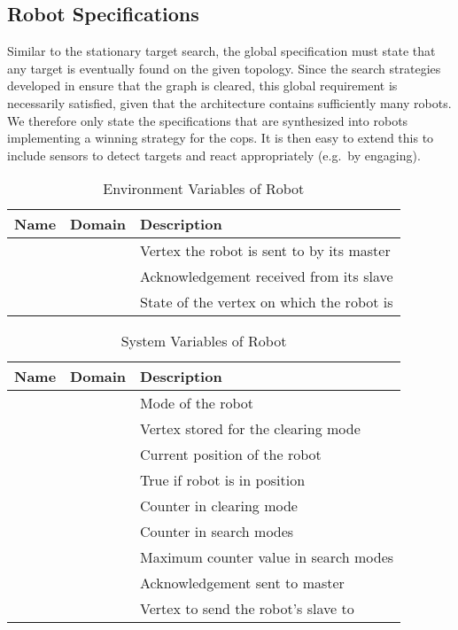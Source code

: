 \subsection{Robot Specifications} \label{sec:robspec}

Similar to the stationary target search, the global specification must state that any target is eventually found on the given topology. Since the search strategies developed in  ensure that the graph is cleared, this global requirement is necessarily satisfied, given that the architecture contains sufficiently many robots. We therefore only state the specifications that are synthesized into robots implementing a winning strategy for the cops. It is then easy to extend this to include sensors to detect targets and react appropriately (e.g.\ by engaging).\\

\begin{table}
\centering
\begin{tabular}{c|c|l}
\hline
Name & Domain & Description \\
\hline
 &  & Vertex the robot is sent to by its master \\
 &  & Acknowledgement received from its slave \\
 &  & State of the vertex on which the robot is \\
\hline
\end{tabular}
\caption{Environment Variables of Robot }
\label{tab:inp:robot}
\end{table}

\begin{table}
\centering
\begin{tabular}{c|c|l}
\hline
Name & Domain & Description \\
\hline
 &  & Mode of the robot \\
 &  & Vertex stored for the clearing mode\\
 &  & Current position of the robot \\
 &  & True if robot  is in position \\
 &  & Counter in clearing mode\\
 &  & Counter in search modes\\
 &  & Maximum counter value in search modes\\
 &  & Acknowledgement sent to master \\
 &  & Vertex to send the robot's slave to \\
\hline
\end{tabular}
\caption{System Variables of Robot }
\label{tab:out:robot}
\end{table}

